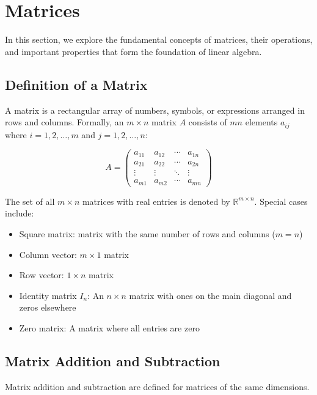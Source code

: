 \section{Matrices}

In this section, we explore the fundamental concepts of matrices, their operations, and important properties that form the foundation of linear algebra.

\subsection{Definition of a Matrix}

A matrix is a rectangular array of numbers, symbols, or expressions arranged in rows and columns. Formally, an \(m \times n\) matrix \(A\) consists of \(mn\) elements \(a_{ij}\) where \(i = 1, 2, \ldots, m\) and \(j = 1, 2, \ldots, n\):

\begin{equation*}
A = 
\begin{pmatrix}
a_{11} & a_{12} & \cdots & a_{1n} \\
a_{21} & a_{22} & \cdots & a_{2n} \\
\vdots & \vdots & \ddots & \vdots \\
a_{m1} & a_{m2} & \cdots & a_{mn}
\end{pmatrix}
\end{equation*}

The set of all \(m \times n\) matrices with real entries is denoted by \(\mathbb{R}^{m \times n}\). Special cases include:
\begin{itemize}[label=\(-\)]
    \item Square matrix: matrix with the same number of rows and columns (\(m = n\))
    \item Column vector: \(m \times 1\) matrix
    \item Row vector: \(1 \times n\) matrix
    \item Identity matrix \(I_n\): An \(n \times n\) matrix with ones on the main diagonal and zeros elsewhere
    \item Zero matrix: A matrix where all entries are zero
\end{itemize}

\subsection{Matrix Addition and Subtraction}

Matrix addition and subtraction are defined for matrices of the same dimensions.

